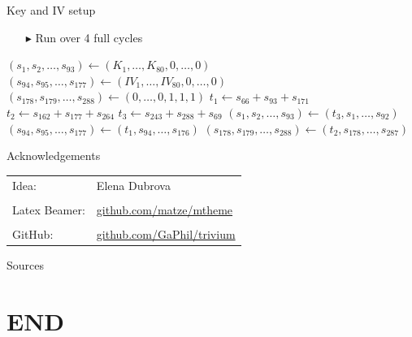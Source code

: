 \documentclass[10pt, compress]{beamer}
\begin{document}
    \begin{frame}{Key and IV setup}
        \begin{itemize}
            \item[$\blacktriangleright$] Run over 4 full cycles
        \end{itemize}
        \begin{center}
            \begin{minipage}{\textwidth}
                \begin{algorithm}[H]
                    \begin{algorithmic}[1]
                        \State $(s_1,s_2,\dots,s_{93}) \gets (K_1,\dots,K_{80},0,\dots,0)$ 
                        \State $(s_{94},s_{95},\dots,s_{177}) \gets (IV_1,\dots,IV_{80},0,\dots,0)$ 
                        \State $(s_{178},s_{179},\dots,s_{288}) \gets (0,\dots,0,1,1,1)$ 
                        \State
                        \State $t_1 \gets s_{66} + s_{93} + s_{171}$
                        \State $t_2 \gets s_{162} + s_{177} + s_{264}$
                        \State $t_3 \gets s_{243} + s_{288}+ s_{69}$
                        \State
                        \State $(s_1,s_2,\dots,s_{93}) \gets (t_3,s_1,\dots,s_{92})$ 
                        \State $(s_{94},s_{95},\dots,s_{177}) \gets (t_1,s_{94},\dots,s_{176})$ 
                        \State $(s_{178},s_{179},\dots,s_{288}) \gets (t_2,s_{178},\dots,s_{287})$ 
                        \EndFor
                    \end{algorithmic}
                \end{algorithm}
            \end{minipage}
        \end{center}
    \end{frame}

    \begin{frame}{Acknowledgements}
        \begin{table}
            \centering
            \begin{tabular}{l l}
                Idea: & Elena Dubrova\\
                & \\
                Latex Beamer: & \url{github.com/matze/mtheme}\\
                & \\
                GitHub: & \url{github.com/GaPhil/trivium}
            \end{tabular}
        \end{table}
    \end{frame}

    \begin{frame}{Sources}
        
        \nocite{*}
    \end{frame}


    \section{END}
\end{document}
